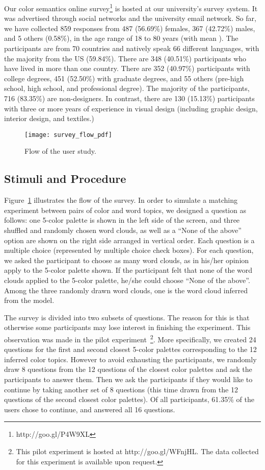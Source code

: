 \documentclass[prodmode,acmtochi]{acmsmall}
\begin{document}
Our color semantics online survey\footnote{http://goo.gl/P4W9XL} is
hosted at our university's survey system.
It was advertised through social networks and the university email
network.  So far, we have collected 859 responses from 487 (56.69\%)
females, 367 (42.72\%) males, and 5 others (0.58\%), in the age range of
18 to 80 years (with mean ).  The participants are from 70 countries and natively
speak 66 different languages, with the majority from the US (59.84\%).  There are
348 (40.51\%) participants who have lived in more than one country.
There are 352 (40.97\%) participants with college degrees, 451 (52.50\%)
with graduate degrees, and 55 others (pre-high school, high school, and
professional degree).  The majority of the participants, 716 (83.35\%)
are non-designers.  In contrast, there are 130 (15.13\%) participants
with three or more years of experience in visual design (including
graphic design, interior design, and textiles.)


\begin{figure}[h!tb]
     \centering
   \texttt{[image: survey\_flow\_pdf]}
 \caption{Flow of the user study.} \label{survey_flow}
   \end{figure}

\subsection{Stimuli and Procedure}

Figure~\ref{survey_flow} illustrates the flow of the survey.  In order
to simulate a matching experiment between pairs of color and word
topics, we designed a question as follows: one 5-color palette is shown
in the left side of the screen, and three shuffled and randomly chosen word
clouds, as well as a ``None of the above'' option are shown on the right side arranged in vertical order.
Each question is a multiple choice (represented by multiple choice check
boxes). For each question, we asked the participant to choose as many word clouds, as in his/her opinion apply to the 5-color palette shown. If the participant felt that none of the word clouds applied to the 5-color palette, he/she could choose ``None of the above''.
Among the three randomly drawn word clouds, one is the word cloud inferred from the model.

The survey is divided into two subsets of questions.
The reason for this is that otherwise some participants may lose interest in finishing the experiment.
This observation was made in the pilot experiment~\footnote{This pilot experiment is hosted at http://goo.gl/WFnjHL. The data collected for this experiment is available upon request.}.
More specifically, we created 24 questions for the first and second closest 5-color
palettes corresponding to the 12 inferred color topics.  However to
avoid exhausting the participants, we randomly draw 8 questions from the 12 questions of the closest color palettes and ask the participants to answer them.  Then we ask the participants if they
would like to continue by taking another set of 8 questions (this time drawn from the 12 questions of the second closest color palettes). Of all participants, 61.35\% of the users chose to continue, and answered all 16 questions.
\end{document}
